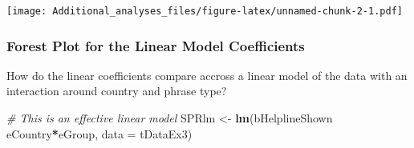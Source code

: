 \documentclass[]{article}
\newenvironment{Shaded}{\begin{snugshade}}{\end{snugshade}}
\newcommand{\CommentTok}[1]{\textcolor[rgb]{0.56,0.35,0.01}{\textit{#1}}}
\newcommand{\DataTypeTok}[1]{\textcolor[rgb]{0.13,0.29,0.53}{#1}}
\newcommand{\KeywordTok}[1]{\textcolor[rgb]{0.13,0.29,0.53}{\textbf{#1}}}
\newcommand{\NormalTok}[1]{#1}
\newcommand{\OperatorTok}[1]{\textcolor[rgb]{0.81,0.36,0.00}{\textbf{#1}}}
\newcommand{\StringTok}[1]{\textcolor[rgb]{0.31,0.60,0.02}{#1}}
\begin{document}
\texttt{[image: Additional\_analyses\_files/figure-latex/unnamed-chunk-2-1.pdf]}

\hypertarget{forest-plot-for-the-linear-model-coefficients}{%
\subsubsection{Forest Plot for the Linear Model
Coefficients}\label{forest-plot-for-the-linear-model-coefficients}}

How do the linear coefficients compare accross a linear model of the
data with an interaction around country and phrase type?

\begin{Shaded}
\begin{Highlighting}[]
\CommentTok{# This is an effective linear model}
\NormalTok{SPRlm <-}\StringTok{ }\KeywordTok{lm}\NormalTok{(bHelplineShown }\OperatorTok{~}\StringTok{ }\NormalTok{eCountry}\OperatorTok{*}\NormalTok{eGroup, }\DataTypeTok{data =}\NormalTok{ tDataEx3)}


\end{Highlighting}
\end{Shaded}
\end{document}
